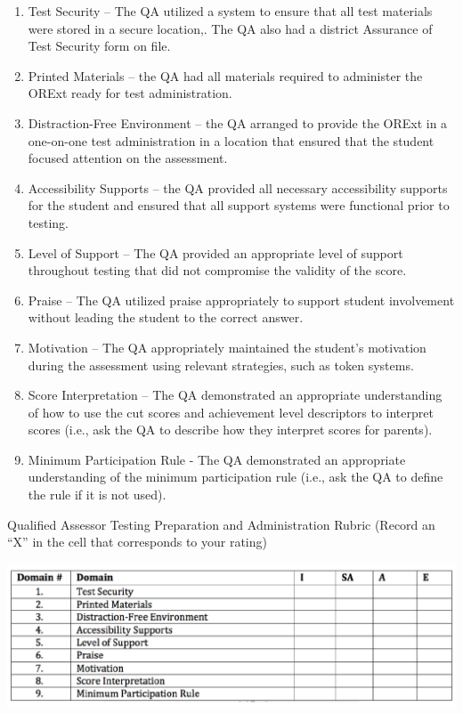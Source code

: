 \documentclass[]{article}
\begin{document}
\begin{enumerate}
\def\labelenumi{\arabic{enumi}.}
\item
  Test Security -- The QA utilized a system to ensure that all test
  materials were stored in a secure location,. The QA also had a
  district Assurance of Test Security form on file.
\item
  Printed Materials -- the QA had all materials required to administer
  the ORExt ready for test administration.
\item
  Distraction-Free Environment -- the QA arranged to provide the ORExt
  in a one-on-one test administration in a location that ensured that
  the student focused attention on the assessment.
\item
  Accessibility Supports -- the QA provided all necessary accessibility
  supports for the student and ensured that all support systems were
  functional prior to testing.
\item
  Level of Support -- The QA provided an appropriate level of support
  throughout testing that did not compromise the validity of the score.
\item
  Praise -- The QA utilized praise appropriately to support student
  involvement without leading the student to the correct answer.
\item
  Motivation -- The QA appropriately maintained the student's motivation
  during the assessment using relevant strategies, such as token
  systems.
\item
  Score Interpretation -- The QA demonstrated an appropriate
  understanding of how to use the cut scores and achievement level
  descriptors to interpret scores (i.e., ask the QA to describe how they
  interpret scores for parents).
\item
  Minimum Participation Rule - The QA demonstrated an appropriate
  understanding of the minimum participation rule (i.e., ask the QA to
  define the rule if it is not used).
\end{enumerate}

Qualified Assessor Testing Preparation and Administration Rubric (Record
an ``X'' in the cell that corresponds to your rating)

\FloatBarrier
\includegraphics{Figures/irr/irr_domain.png}
\end{document}
